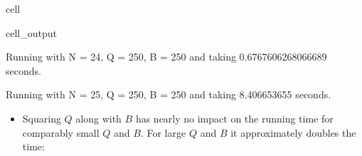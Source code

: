 \documentclass[letterpaper,10pt,english]{jupyterBook}
\begin{document}
\begin{sphinxuseclass}{cell}
\begin{sphinxVerbatimOutput}
\begin{sphinxuseclass}{cell_output}
\begin{sphinxVerbatim}[commandchars=\\\{\}]
Running with N = 2\PYGZca{}4, Q = 2\PYGZca{}50, B = 2\PYGZca{}50 and taking 0.6767606268066689 seconds.
\end{sphinxVerbatim}

\begin{sphinxVerbatim}[commandchars=\\\{\}]
Running with N = 2\PYGZca{}5, Q = 2\PYGZca{}50, B = 2\PYGZca{}50 and taking 8.406653655 seconds.
\end{sphinxVerbatim}

\end{sphinxuseclass}\end{sphinxVerbatimOutput}

\end{sphinxuseclass}\begin{itemize}
\item {} 
\sphinxAtStartPar
Squaring \(Q\) along with \(B\) has nearly no impact on the running time for comparably small \(Q\) and \(B\). For large \(Q\) and \(B\) it approximately doubles the time:

\end{itemize}
\end{document}
